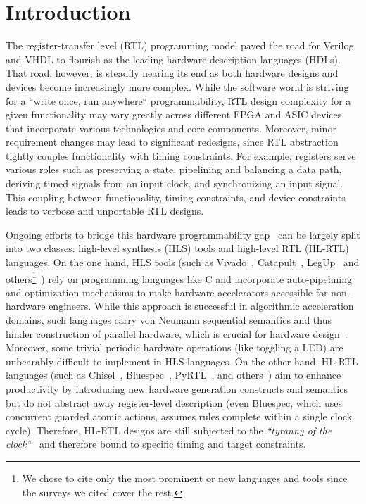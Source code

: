 \section{Introduction}
The register-transfer level (RTL) programming model paved the road for Verilog and VHDL to flourish as the leading hardware description languages (HDLs). That road, however, is steadily nearing its end as both hardware designs and devices become increasingly more complex. While the software world is striving for a ``write once, run anywhere`` programmability, RTL design complexity for a given functionality may vary greatly across different FPGA and ASIC devices that incorporate various technologies and core components. Moreover, minor requirement changes may lead to significant redesigns, since RTL abstraction tightly couples functionality with timing constraints. For example, registers serve various roles such as preserving a state, pipelining and balancing a data path, deriving timed signals from an input clock, and synchronizing an input signal. This coupling between functionality, timing constraints, and device constraints leads to verbose and unportable RTL designs. 




Ongoing efforts to bridge this hardware programmability gap~\cite{Kapre2016, Nane2016, Windh2015, Lahti2019} can be largely split into two classes: high-level synthesis (HLS) tools and high-level RTL (HL-RTL) languages.
On the one hand, HLS tools (such as Vivado~\cite{Vivado2012}, Catapult~\cite{graphics2008catapult}, LegUp~\cite{Canis2013} and others\footnote{We chose to cite only the most prominent or new languages and tools since the surveys we cited cover the rest.}~\cite{Kavvadias2013, synphony2015, Serre, Koeplinger2018}) rely on programming languages like C and incorporate auto-pipelining and optimization mechanisms to make hardware accelerators accessible for non-hardware engineers. While this approach is successful in algorithmic acceleration domains, such languages carry von Neumann sequential semantics and thus hinder construction of parallel hardware, which is crucial for hardware design~\cite{Zhao2017}. Moreover, some trivial periodic hardware operations (like toggling a LED) are unbearably difficult to implement in HLS languages.
On the other hand, HL-RTL languages (such as Chisel~\cite{Bachrach2012}, Bluespec~\cite{nikhil2004bluespec}, PyRTL~\cite{Clow2017}, and others\footnotemark[\value{footnote}]~\cite{Charles2016, Liu2017, jiang2018mamba, decaluwe2004myhdl, CxLang2014, Lockhart2014, Bellows}) aim to enhance productivity by introducing new hardware generation constructs and semantics but do not abstract away register-level description (even Bluespec, which uses concurrent guarded atomic actions, assumes rules complete within a single clock cycle). Therefore, HL-RTL designs are still subjected to the \emph{``tyranny of the clock``}~\cite{Sutherland2012} and therefore bound to specific timing and target constraints.

